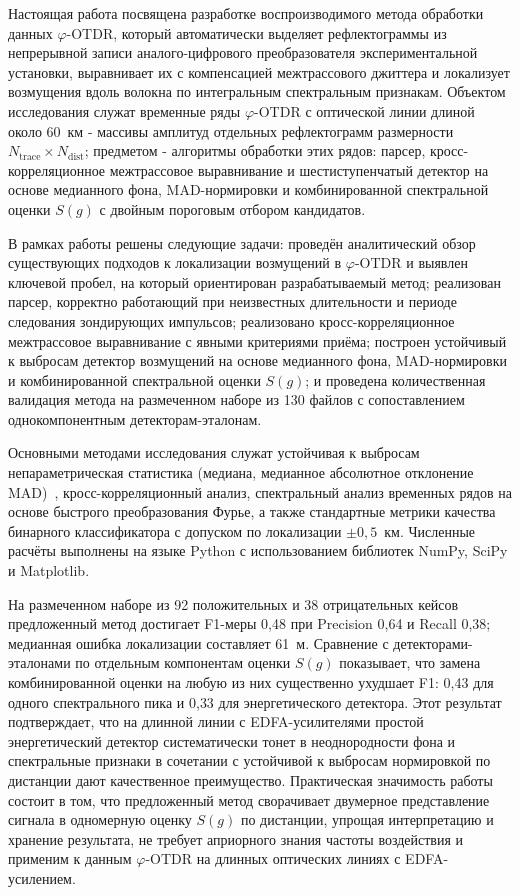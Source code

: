\documentclass[12pt,a4paper]{extarticle}
\newcommand{\phiOTDR}{$\varphi$-OTDR}
\begin{document}
Настоящая работа посвящена разработке воспроизводимого метода обработки данных \phiOTDR, который автоматически выделяет рефлектограммы из непрерывной записи аналого-цифрового преобразователя экспериментальной установки, выравнивает их с компенсацией межтрассового джиттера и локализует возмущения вдоль волокна по интегральным спектральным признакам. Объектом исследования служат временные ряды \phiOTDR{} с оптической линии длиной около 60~км - массивы амплитуд отдельных рефлектограмм размерности $N_\text{trace} \times N_\text{dist}$; предметом - алгоритмы обработки этих рядов: парсер, кросс-корреляционное межтрассовое выравнивание и шестиступенчатый детектор на основе медианного фона, MAD-нормировки и комбинированной спектральной оценки $S(g)$ с двойным пороговым отбором кандидатов.

В рамках работы решены следующие задачи: проведён аналитический обзор существующих подходов к локализации возмущений в \phiOTDR{} и выявлен ключевой пробел, на который ориентирован разрабатываемый метод; реализован парсер, корректно работающий при неизвестных длительности и периоде следования зондирующих импульсов; реализовано кросс-корреляционное межтрассовое выравнивание с явными критериями приёма; построен устойчивый к выбросам детектор возмущений на основе медианного фона, MAD-нормировки и комбинированной спектральной оценки $S(g)$; и проведена количественная валидация метода на размеченном наборе из 130 файлов с сопоставлением одно\-ком\-по\-нент\-ным детекторам-эталонам.

Основными методами исследования служат устойчивая к выбросам непараметрическая статистика (медиана, медианное абсолютное отклонение MAD)~\cite{Hampel1974}, кросс-корреляционный анализ, спектральный анализ временных рядов на основе быстрого преобразования Фурье, а также стандартные метрики качества бинарного классификатора с допуском по локализации $\pm 0{,}5$~км. Численные расчёты выполнены на языке Python с использованием библиотек NumPy, SciPy и Matplotlib.

На размеченном наборе из 92 положительных и 38 отрицательных кейсов предложенный метод достигает F1-меры 0{,}48 при Precision 0{,}64 и Recall 0{,}38; медианная ошибка локализации составляет 61~м. Сравнение с детекторами-эталонами по отдельным компонентам оценки $S(g)$ показывает, что замена комбинированной оценки на любую из них существенно ухудшает F1: 0{,}43 для одного спектрального пика и 0{,}33 для энергетического детектора. Этот результат подтверждает, что на длинной линии с EDFA-усилителями простой энергетический детектор систематически тонет в неоднородности фона и спектральные признаки в сочетании с устойчивой к выбросам нормировкой по дистанции дают качественное преимущество. Практическая значимость работы состоит в том, что предложенный метод сворачивает двумерное представление сигнала в одномерную оценку $S(g)$ по дистанции, упрощая интерпретацию и хранение результата, не требует априорного знания частоты воздействия и применим к данным \phiOTDR{} на длинных оптических линиях с EDFA-усилением.
\end{document}

